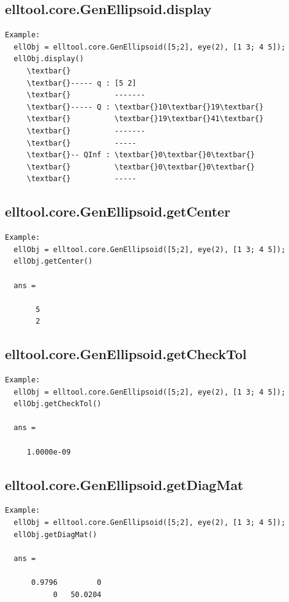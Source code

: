 \documentclass[letterpaper,10pt,english]{sphinxmanual}
\begin{document}
\subsection{elltool.core.GenEllipsoid.display}
\label{chap_functions:elltool-core-genellipsoid-display}
\begin{Verbatim}[commandchars=\\\{\}]
Example:
  ellObj = elltool.core.GenEllipsoid([5;2], eye(2), [1 3; 4 5]);
  ellObj.display()
     \textbar{}
     \textbar{}----- q : [5 2]
     \textbar{}          -------
     \textbar{}----- Q : \textbar{}10\textbar{}19\textbar{}
     \textbar{}          \textbar{}19\textbar{}41\textbar{}
     \textbar{}          -------
     \textbar{}          -----
     \textbar{}-- QInf : \textbar{}0\textbar{}0\textbar{}
     \textbar{}          \textbar{}0\textbar{}0\textbar{}
     \textbar{}          -----
\end{Verbatim}


\subsection{elltool.core.GenEllipsoid.getCenter}
\label{chap_functions:elltool-core-genellipsoid-getcenter}
\begin{Verbatim}[commandchars=\\\{\}]
Example:
  ellObj = elltool.core.GenEllipsoid([5;2], eye(2), [1 3; 4 5]);
  ellObj.getCenter()

  ans =

       5
       2
\end{Verbatim}


\subsection{elltool.core.GenEllipsoid.getCheckTol}
\label{chap_functions:elltool-core-genellipsoid-getchecktol}
\begin{Verbatim}[commandchars=\\\{\}]
Example:
  ellObj = elltool.core.GenEllipsoid([5;2], eye(2), [1 3; 4 5]);
  ellObj.getCheckTol()

  ans =

     1.0000e-09
\end{Verbatim}


\subsection{elltool.core.GenEllipsoid.getDiagMat}
\label{chap_functions:elltool-core-genellipsoid-getdiagmat}
\begin{Verbatim}[commandchars=\\\{\}]
Example:
  ellObj = elltool.core.GenEllipsoid([5;2], eye(2), [1 3; 4 5]);
  ellObj.getDiagMat()

  ans =

      0.9796         0
           0   50.0204
\end{Verbatim}
\end{document}
